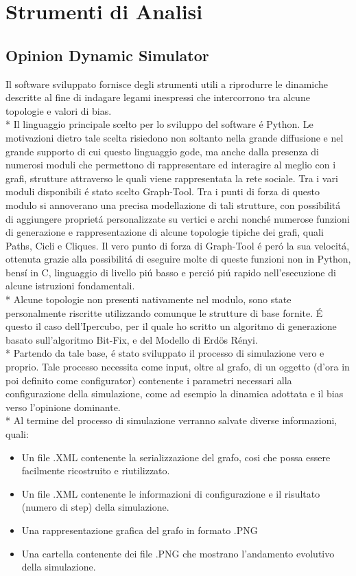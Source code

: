 \documentclass[../Tesi.tex]{subfiles}
\begin{document}
\chapter{Strumenti di Analisi}
\section{Opinion Dynamic Simulator}
Il software sviluppato fornisce degli strumenti utili a riprodurre le dinamiche descritte al fine di indagare legami inespressi che intercorrono tra alcune topologie e valori di bias.\\*
Il linguaggio principale scelto per lo sviluppo del software \'e Python. Le motivazioni dietro tale scelta risiedono non soltanto nella grande diffusione e nel grande supporto di cui questo linguaggio gode, ma anche dalla presenza di numerosi moduli che permettono di rappresentare ed interagire al meglio con i grafi, strutture attraverso le quali viene rappresentata la rete sociale.
Tra i vari moduli disponibili \'e stato scelto Graph-Tool. Tra i punti di forza di questo modulo si annoverano una precisa modellazione di tali strutture, con possibilit\'a di aggiungere propriet\'a personalizzate su vertici e archi nonch\'e numerose funzioni di generazione e rappresentazione di alcune topologie tipiche dei grafi, quali Paths, Cicli e Cliques. Il vero punto di forza di Graph-Tool \'e per\'o la sua velocit\'a, ottenuta grazie alla possibilit\'a di eseguire molte di queste funzioni non in Python, bens\'i in C, linguaggio di livello pi\'u basso e perci\'o pi\'u rapido nell'esecuzione di alcune istruzioni fondamentali.\\*
Alcune topologie non presenti nativamente nel modulo, sono state personalmente riscritte utilizzando comunque le strutture di base fornite. É questo il caso dell'Ipercubo, per il quale ho scritto un algoritmo di generazione basato sull'algoritmo Bit-Fix, e del Modello di Erd{\"o}s R\'enyi.\\*
Partendo da tale base, \'e stato sviluppato il processo di simulazione vero e proprio. Tale processo necessita come input, oltre al grafo, di un oggetto (d'ora in poi definito come configurator) contenente i parametri necessari alla configurazione della simulazione, come ad esempio la dinamica adottata e il bias verso l'opinione dominante.\\* 
Al termine del processo di simulazione verranno salvate diverse informazioni, quali:
\begin{itemize}
\item Un file .XML contenente la serializzazione del grafo, cosi che possa essere facilmente ricostruito e riutilizzato.
\item Un file .XML contenente le informazioni di configurazione e il risultato (numero di step) della simulazione.
\item Una rappresentazione grafica del grafo in formato .PNG
\item Una cartella contenente dei file .PNG che mostrano l'andamento evolutivo della simulazione.
\end{itemize}
\end{document}
